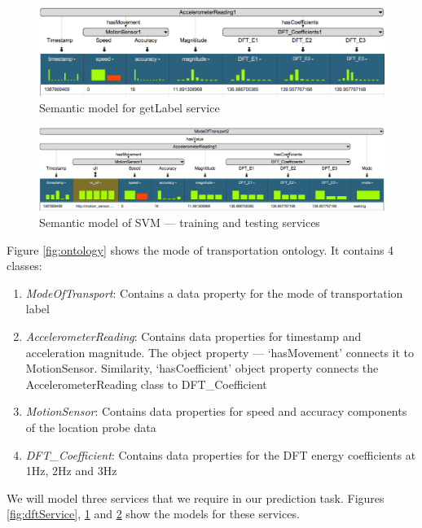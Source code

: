 \begin{figure}[ht!]
\centering
\includegraphics[width=180mm]{img/getLabelService}
\caption{Semantic model for getLabel service\label{fig:imgGetLabelService}}
\end{figure}

\begin{figure}[bp]
\centering
\includegraphics[width=180mm]{img/svmService}
\caption{Semantic model of SVM --- training and testing services\label{fig:svmService}}
\end{figure}

Figure \ref{fig:ontology} shows the mode of transportation ontology. It contains 4 classes:
\begin{enumerate}
  \item \textit{ModeOfTransport}: Contains a data property for the mode of transportation label
  \item \textit{AccelerometerReading}: Contains data properties for timestamp and acceleration magnitude. The object property --- `hasMovement' connects it to MotionSensor. Similarity, `hasCoefficient' object property connects the AccelerometerReading class to DFT\_Coefficient
  \item \textit{MotionSensor}: Contains data properties for speed and accuracy components of the location probe data
  \item \textit{DFT\_Coefficient}: Contains data properties for the DFT energy coefficients at 1Hz, 2Hz and 3Hz
\end{enumerate} 

We will model three services that we require in our prediction task. Figures \ref{fig:dftService}, \ref{fig:imgGetLabelService} and \ref{fig:svmService} show the models for these services.

